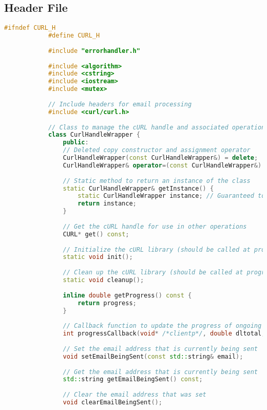 \documentclass{article}
\begin{document}
	\subsection*{Header File}
	\begin{mdframed}[backgroundcolor=background, hidealllines=false, innerleftmargin=15pt, innerrightmargin=5pt, innertopmargin=0pt, innerbottommargin=-5pt, linecolor=accent]
		\begin{lstlisting}[language=C++]
			#ifndef CURL_H
			#define CURL_H
			
			#include "errorhandler.h"
			
			#include <algorithm>
			#include <cstring>
			#include <iostream>
			#include <mutex>
			
			// Include headers for email processing
			#include <curl/curl.h>
			
			// Class to manage the cURL handle and associated operations
			class CurlHandleWrapper {
				public:
				// Deleted copy constructor and assignment operator
				CurlHandleWrapper(const CurlHandleWrapper&) = delete;
				CurlHandleWrapper& operator=(const CurlHandleWrapper&) = delete;
				
				// Static method to return an instance of the class
				static CurlHandleWrapper& getInstance() {
					static CurlHandleWrapper instance; // Guaranteed to be destroyed, instantiated on first use.
					return instance;
				}
				
				// Get the cURL handle for use in other operations
				CURL* get() const;
				
				// Initialize the cURL library (should be called at program start)
				static void init();
				
				// Clean up the cURL library (should be called at program end)
				static void cleanup();
				
				inline double getProgress() const {
					return progress;
				}
				
				// Callback function to update the progress of ongoing operations
				int progressCallback(void* /*clientp*/, double dltotal, double dlnow, double /*ultotal*/, double /*ulnow*/);
				
				// Set the email address that is currently being sent
				void setEmailBeingSent(const std::string& email);
				
				// Get the email address that is currently being sent
				std::string getEmailBeingSent() const;
				
				// Clear the email address that was set
				void clearEmailBeingSent();
				

\end{lstlisting}
\end{mdframed}
\end{document}
